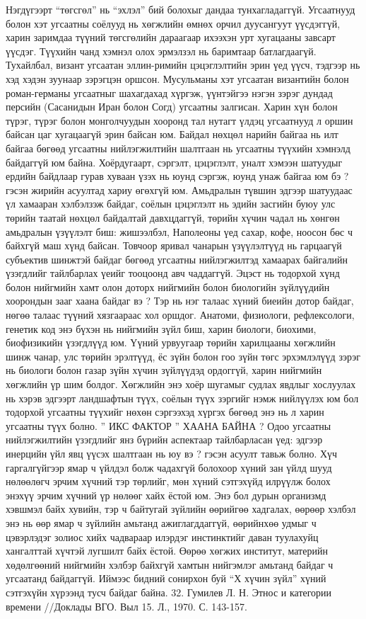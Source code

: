 Нэгдүгээрт “төгсгөл” нь “эхлэл” бий болохыг дандаа тунхагладаггүй. Угсаатнууд болон хэт угсаатны соёлууд нь хөгжлийн өмнөх орчил дуусангуут үүсдэггүй, харин заримдаа түүний төгсгөлийн дараагаар ихээхэн урт хугацааны завсарт үүсдэг. Түүхийн чанд хэмнэл олох эрмэлзэл нь баримтаар батлагдаагүй. Тухайлбал, визант угсаатан эллин-римийн цэцэглэлтийн эрин үед үүсч, тэдгээр нь хэд хэдэн зуунаар зэрэгцэн оршсон. Мусульманы хэт угсаатан византийн болон роман-германы угсаатныг шахагдахад хүргэж, үүнтэйгээ нэгэн зэрэг дундад персийн (Сасанидын Иран болон Согд) угсаатны залгисан. Харин хүн болон түрэг, түрэг болон монголчуудын хооронд тал нутагт үлдэц угсаатнууд л оршин байсан цаг хугацаагүй эрин байсан юм. Байдал нөхцөл нарийн байгаа нь илт байгаа бөгөөд угсаатны нийлэгжилтийн шалтгаан нь угсаатны түүхийн хэмнэлд байдаггүй юм байна.
Хоёрдугаарт, сэргэлт, цэцэглэлт, уналт хэмээн шатуудыг ердийн байдлаар гурав хуваан үзэх нь юунд сэргэж, юунд унаж байгаа юм бэ ? гэсэн жирийн асуултад хариу өгөхгүй юм. Амьдралын түвшин эдгээр шатуудаас үл хамааран хэлбэлзэж байдаг, соёлын цэцэглэлт нь эдийн засгийн буюу улс төрийн таатай нөхцөл байдалтай давхцдаггүй, төрийн хүчин чадал нь хөнгөн амьдралын үзүүлэлт биш: жишээлбэл, Наполеоны үед сахар, кофе, ноосон бөс ч байхгүй маш хүнд байсан. Товчоор яривал чанарын үзүүлэлтүүд нь гарцаагүй субъектив шинжтэй байдаг бөгөөд угсаатны нийлэгжилтэд хамаарах байгалийн үзэгдлийг тайлбарлах үеийг тооцоонд авч чаддаггүй. Эцэст нь тодорхой хүнд болон нийгмийн хамт олон доторх нийгмийн болон биологийн зүйлүүдийн хоорондын зааг хаана байдаг вэ ? Тэр нь нэг талаас хүний биеийн дотор байдаг, нөгөө талаас түүний хязгаараас хол оршдог. Анатоми, физиологи, рефлексологи, генетик код энэ бүхэн нь нийгмийн зүйл биш, харин биологи, биохими, биофизикийн үзэгдлүүд юм. Үүний урвуугаар төрийн харилцааны хөгжлийн шинж чанар, улс төрийн эрэлтүүд, ёс зүйн болон гоо зүйн төгс эрхэмлэлүүд зэрэг нь биологи болон газар зүйн хүчин зүйлүүдэд ордоггүй, харин нийгмийн хөгжлийн үр шим болдог. Хөгжлийн энэ хоёр шугамыг судлах явдлыг хослуулах нь хэрэв эдгээрт ландшафтын түүх, соёлын түүх зэргийг нэмж нийлүүлэх юм бол тодорхой угсаатны түүхийг нөхөн сэргээхэд хүргэх бөгөөд энэ нь л харин угсаатны түүх болно.
” ИКС ФАКТОР ” ХААНА БАЙНА ?
Одоо угсаатны нийлэгжилтийн үзэгдлийг янз бүрийн аспектаар тайлбарласан үед: эдгээр инерцийн үйл явц үүсэх шалтгаан нь юу вэ ? гэсэн асуулт тавьж болно. Хүч гаргалгүйгээр ямар ч үйлдэл болж чадахгүй болохоор хүний зан үйлд шууд нөлөөлөгч эрчим хүчний тэр төрлийг, мөн хүний сэтгэхүйд илрүүлж болох энэхүү эрчим хүчний үр нөлөөг хайх ёстой юм. Энэ бол дурын организмд хэвшмэл байх хувийн, тэр ч байтугай зүйлийн өөрийгөө хадгалах, өөрөөр хэлбэл энэ нь өөр ямар ч зүйлийн амьтанд ажиглагддаггүй, өөрийнхөө удмыг ч цэвэрлэдэг золиос хийх чадвараар илэрдэг инстинктийг даван туулахуйц хангалттай хүчтэй лугшилт байх ёстой. Өөрөө хөгжих институт, материйн хөдөлгөөний нийгмийн хэлбэр байхгүй хамтын нийгэмлэг амьтанд байдаг ч угсаатанд байдаггүй. Иймээс бидний сонирхон буй “Х хүчин зүйл” хүний сэтгэхүйн хүрээнд тусч байдаг байна. 32. Гумилев Л. Н. Этнос и категории времени //Доклады ВГО. Выл 15. Л., 1970. С. 143-157.
